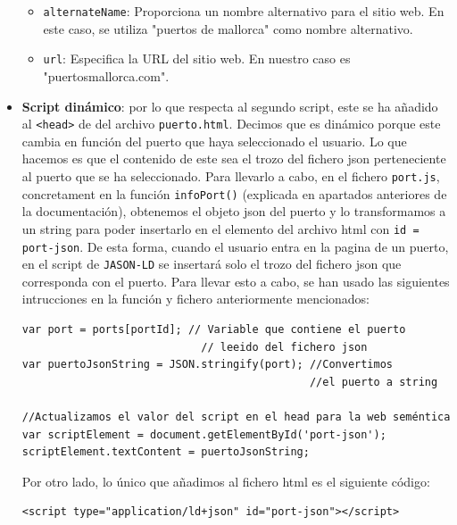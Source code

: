 \documentclass{article}
\begin{document}
\begin{itemize}
\begin{itemize}
       \item \texttt{alternateName}: Proporciona un nombre alternativo para el sitio web. En este caso, se utiliza "puertos de mallorca" como nombre alternativo.
       
       \item \texttt{url}: Especifica la URL del sitio web. En nuestro caso es "puertosmallorca.com".
    \end{itemize}
    \item \textbf{Script dinámico}: por lo que respecta al segundo script, este se ha añadido al \texttt{<head>} de del archivo \texttt{puerto.html}. Decimos que es dinámico porque este cambia en función del puerto que haya seleccionado el usuario. Lo que hacemos es que el contenido de este sea el trozo del fichero json perteneciente al puerto que se ha seleccionado. Para llevarlo a cabo, en el fichero \texttt{port.js}, concretament en la función \texttt{infoPort()} (explicada en apartados anteriores de la documentación), obtenemos el objeto json del puerto y lo transformamos a un string para poder insertarlo en el elemento del archivo html con \texttt{id = port-json}. De esta forma, cuando el usuario entra en la pagina de un puerto, en el script de \texttt{JASON-LD} se insertará solo el trozo del fichero json que corresponda con el puerto. Para llevar esto a cabo, se han usado las siguientes intrucciones en la función y fichero anteriormente mencionados:
    \begin{verbatim}
var port = ports[portId]; // Variable que contiene el puerto 
                            // leeido del fichero json
var puertoJsonString = JSON.stringify(port); //Convertimos 
                                             //el puerto a string

//Actualizamos el valor del script en el head para la web seméntica
var scriptElement = document.getElementById('port-json');
scriptElement.textContent = puertoJsonString;
    \end{verbatim}

    Por otro lado, lo único que añadimos al fichero html es el siguiente código:
    \begin{verbatim}
<script type="application/ld+json" id="port-json"></script>
    \end{verbatim}
\end{itemize}
\end{document}
